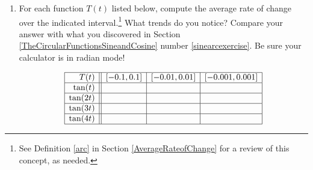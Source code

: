 \begin{enumerate}
\setcounter{enumi}{\value{HW}}

\item \label{tangentarcexercise}For each function $T(t)$ listed below, compute the average rate of change over the indicated interval.\footnote{See Definition \ref{arc} in Section \ref{AverageRateofChange} for a review of this concept, as needed.}  What trends do you notice? Compare your answer with what you discovered in Section \ref{TheCircularFunctionsSineandCosine} number \ref{sinearcexercise}.  Be sure your calculator is in radian mode!

\[ \begin{array}{|r||c|c|c|}  \hline

 T(t) &  [-0.1, 0.1] & [-0.01, 0.01] &[-0.001, 0.001] \\ \hline
 \tan(t)     &&&  \\  \hline
 \tan(2t)   &&&  \\ \hline
 \tan(3t)   &&&   \\  \hline
 \tan(4t)   &&&   \\  \hline

\end{array} \]

\setcounter{HW}{\value{enumi}}
\end{enumerate}



